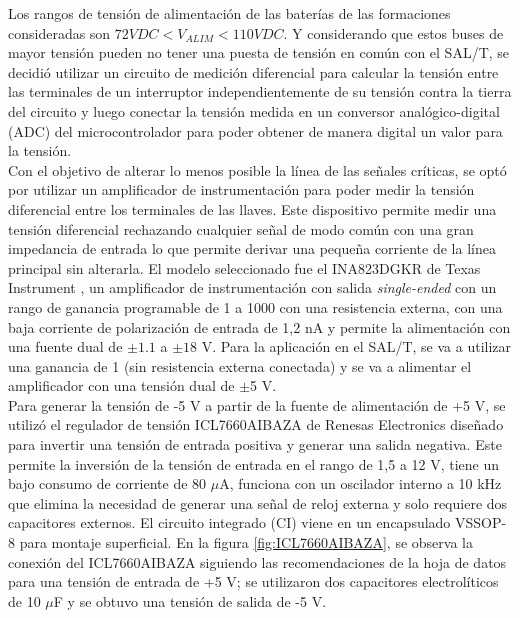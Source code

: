Los rangos de tensión de alimentación de las baterías de las formaciones consideradas son $ 72 VDC < V_{ALIM} < 110 VDC $. Y considerando que estos buses de mayor tensión pueden no tener una puesta de tensión en común con el SAL/T, se decidió utilizar un circuito de medición diferencial para calcular la tensión entre las terminales de un interruptor independientemente de su tensión contra la tierra del circuito y luego conectar la tensión medida en un conversor analógico-digital (ADC) del microcontrolador para poder obtener de manera digital un valor para la tensión. \\ 


Con el objetivo de alterar lo menos posible la línea de las señales críticas, se optó por utilizar un amplificador de instrumentación para poder medir la tensión diferencial entre los terminales de las llaves. Este dispositivo permite medir una tensión diferencial rechazando cualquier señal de modo común con una gran impedancia de entrada lo que permite derivar una pequeña corriente de la línea principal sin alterarla. El modelo seleccionado fue el INA823DGKR de Texas Instrument \cite{INA823DGKR}, un amplificador de instrumentación con salida \textit{single-ended} con un rango de ganancia programable de 1 a 1000 con una resistencia externa, con una baja corriente de polarización de entrada de 1,2 nA y permite la alimentación con una fuente dual de $\pm1.1$ a $\pm18 $ V. Para la aplicación en el SAL/T, se va a utilizar una ganancia de 1 (sin resistencia externa conectada) y se va a alimentar el amplificador con una tensión dual de $\pm$5 V.\\

Para generar la tensión de -5 V a partir de la fuente de alimentación de +5 V, se utilizó el regulador de tensión ICL7660AIBAZA de Renesas Electronics \cite{ICL7660AIBAZA} diseñado para invertir una tensión de entrada positiva y generar una salida negativa. Este permite la inversión de la tensión de entrada en el rango de 1,5 a 12 V, tiene un bajo consumo de corriente de 80 $\mu$A, funciona con un oscilador interno a 10 kHz que elimina la necesidad de generar una señal de reloj externa y solo requiere dos capacitores externos. El circuito integrado (CI) viene en un encapsulado VSSOP-8 para montaje superficial. En la figura \ref{fig:ICL7660AIBAZA}, se observa la conexión del ICL7660AIBAZA siguiendo las recomendaciones de la hoja de datos para una tensión de entrada de +5 V; se utilizaron dos capacitores electrolíticos de 10 $\mu$F y se obtuvo una tensión de salida de -5 V. 

